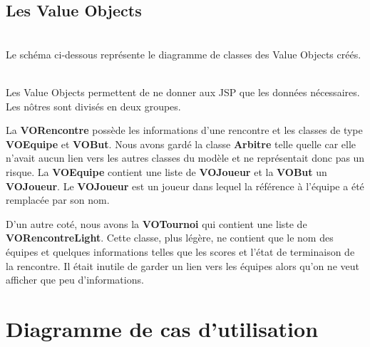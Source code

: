 \documentclass[10pt]{report}
\begin{document}
\newpage
\subsection{Les Value Objects}
~\\
Le schéma ci-dessous représente le diagramme de classes des Value Objects créés. \\
	\begin{figure}[here]
	      \begin{center}
	      \end{center}
	\end{figure}
\\

Les Value Objects permettent de ne donner aux JSP que les données nécessaires. Les nôtres sont divisés en deux groupes.

La \textbf{VORencontre} possède les informations d'une rencontre et les classes de type \textbf{VOEquipe} et \textbf{VOBut}.
Nous avons gardé la classe \textbf{Arbitre} telle quelle car elle n'avait aucun lien vers les autres classes du modèle et ne représentait donc pas un risque.
La \textbf{VOEquipe} contient une liste de \textbf{VOJoueur} et la \textbf{VOBut} un \textbf{VOJoueur}.
Le \textbf{VOJoueur} est un joueur dans lequel la référence à l'équipe a été remplacée par son nom.

D'un autre coté, nous avons la \textbf{VOTournoi} qui contient une liste de \textbf{VORencontreLight}.
Cette classe, plus légère, ne contient que le nom des équipes et quelques informations telles que les scores et l'état de terminaison de la rencontre.
Il était inutile de garder un lien vers les équipes alors qu'on ne veut afficher que peu d'informations.

\newpage
\section{Diagramme de cas d'utilisation}
\end{document}
